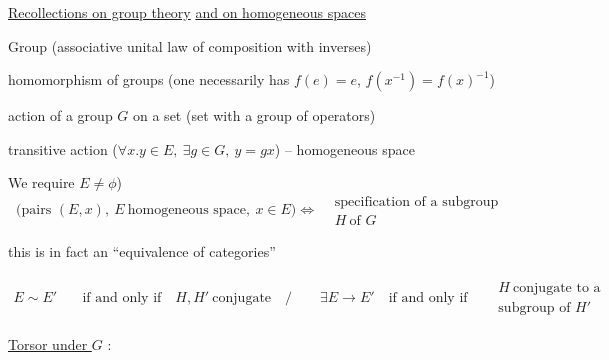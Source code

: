 \uline{Recollections on group theory} \uline{and on homogeneous spaces}

Group (associative unital law of composition with inverses)

homomorphism of groups (one necessarily has $f(e)=e$, $f(x^{-1})=f(x)^{-1}$)

action of a group $G$ on a set (set with a group of operators)

transitive action ($\forall x\mathord{.}y\in E,\ \exists g\in G,\ y=gx$) -- homogeneous space

We require  $E\ne\phi$)
\[
\bigl(\text{pairs }(E,x),\ E\ \text{homogeneous space},\ x\in E\bigr)
\Longleftrightarrow
\begin{aligned}&\text{specification of a subgroup}\\&H\ \text{of }G\end{aligned}
\]

this is in fact an ``equivalence of categories''

{\small
{}}
{\small
\[
\begin{aligned}
E\sim E' \quad &\text{if and only if}\quad H,H'\ \text{conjugate}\quad \big/\qquad
\exists E\to E'\quad\text{if and only if}\quad \begin{aligned}&H\ \text{conjugate to a}\\&\text{subgroup of }H'\end{aligned}
\end{aligned}
\]}

\uline{Torsor under $G$} :
{\small
{}}

